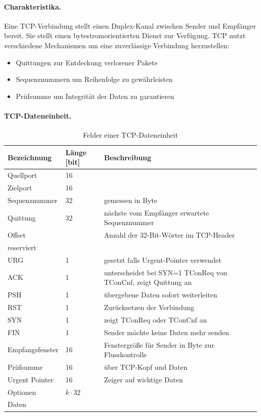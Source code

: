 \documentclass[]{scrartcl}
\begin{document}
\paragraph{Charakteristika.} Eine TCP-Verbindung stellt einen Duplex-Kanal zwischen Sender und Empf\"anger bereit. Sie stellt einen bytestromorientierten Dienst zur Verf\"ugung. TCP nutzt verschiedene Mechanismen um eine zuverl\"assige Verbindung herzustellen:
\begin{itemize}
\item Quittungen zur Entdeckung verlorener Pakete
\item Sequenznummern um Reihenfolge zu gew\"ahrleisten
\item Pr\"ufsumme um Integrit\"at der Daten zu garantieren
\end{itemize}

\paragraph{TCP-Dateneinheit.}

\begin{table}[H]
\begin{center}
\begin{tabular}{lll}
Bezeichnung & L\"ange [bit] & Beschreibung \\
\toprule
 Quellport & 16 & \\
Zielport & 16 & \\
Sequenznummer & 32 & gemessen in Byte\\
Quittung & 32 & n\"achste vom Empf\"anger erwartete Sequenznummer \\
 Offset & & Anzahl der 32-Bit-W\"orter im TCP-Header \\
 reserviert& & \\
 URG & 1 & gesetzt falls Urgent-Pointer verwendet \\
 ACK & 1 & unterscheidet bei SYN=1 TConReq von TConCnf, zeigt Quittung an\\
 PSH & 1 & \"ubergebene Daten sofort weiterleiten \\
 RST & 1 & Zur\"ucksetzen der Verbindung \\
 SYN & 1 & zeigt TConReq oder TConCnf an\\
 FIN & 1 & Sender m\"ochte keine Daten mehr senden\\
  Empfangsfenster & 16 & Fenstergr\"o{\ss}e f\"ur Sender in Byte zur Flusskontrolle \\
  Pr\"ufsumme & 16 & \"uber TCP-Kopf und Daten \\
  Urgent Pointer & 16 & Zeiger auf wichtige Daten\\
  \midrule
  Optionen & $k \cdot 32$ & \\
  \midrule
  Daten & & \\
\bottomrule
\end{tabular}
\caption{Felder einer TCP-Dateneinheit}
\end{center}
\end{table}
\end{document}
